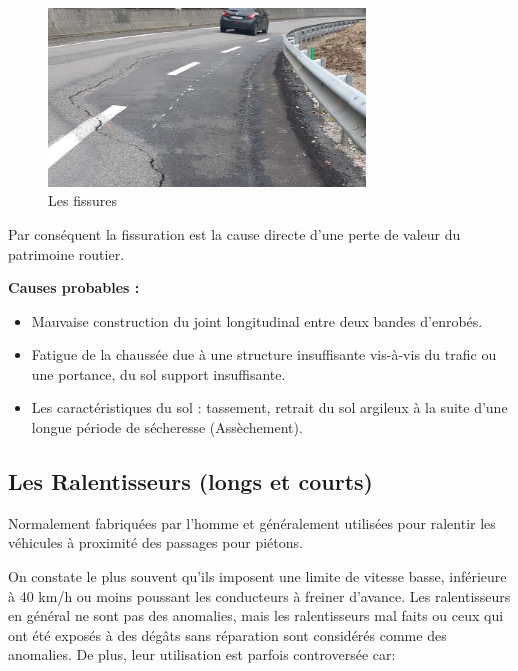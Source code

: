 \begin{figure}[h!]
  \center
  \includegraphics[width=0.75\textwidth]{Images/chapter1/fissures.jpg}
  \caption{Les fissures}
  \label{fig:Technologies}
\end{figure}

Par conséquent la fissuration est la cause directe d'une perte de valeur du patrimoine routier.

\textbf{Causes probables :}
\renewcommand{\labelitemi}{$\bullet$}
\begin{itemize}

  \item Mauvaise construction du joint longitudinal entre deux bandes d'enrobés.
  \item Fatigue de la chaussée due à une structure insuffisante vis-à-vis du trafic
        ou une portance, du sol support insuffisante.
  \item Les caractéristiques du sol : tassement, retrait du sol argileux à la suite
        d'une longue période de sécheresse (Assèchement).
\end{itemize}


\subsection{Les Ralentisseurs (longs et courts)}

Normalement fabriquées par l'homme et généralement utilisées pour ralentir les véhicules à proximité des passages pour piétons.

On constate le plus souvent qu'ils imposent une limite de vitesse basse, inférieure à 40 km/h ou moins poussant les conducteurs à freiner d'avance.
Les ralentisseurs en général ne sont pas des anomalies, mais les ralentisseurs mal faits ou ceux qui ont été exposés à des dégâts sans réparation sont considérés comme des anomalies.
De plus, leur utilisation est parfois controversée car:

